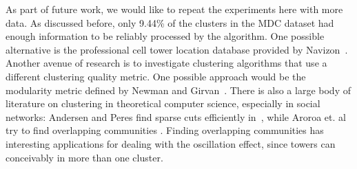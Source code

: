 \documentclass[letterpaper, 12pt, conference]{ieeeconf}
\begin{document}
As part of future work, we would like to repeat the experiments here with 
more data. As discussed before, only 9.44\% of the clusters in the MDC 
dataset had enough information to be reliably processed by the algorithm. One 
possible alternative is the professional cell tower location database 
provided by Navizon~\cite{navizon}. Another avenue of research is to 
investigate clustering algorithms that use a different clustering quality 
metric. One possible approach would be the modularity metric defined by 
Newman and Girvan~\cite{newman}. There is also a large body of literature on 
clustering in theoretical computer science, especially in social networks: 
Andersen and Peres find sparse cuts efficiently in~\cite{sparsecuts}, while 
Aroroa et. al try to find overlapping communities \cite{overlapping}. Finding 
overlapping communities has interesting applications for dealing with the 
oscillation effect, since towers can conceivably in more than one cluster.



\end{document}
